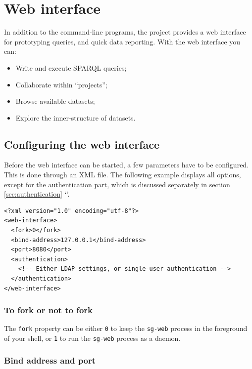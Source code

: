 \chapter{Web interface}
\label{chap:web-interface}

  In addition to the command-line programs, the project provides a web
  interface for prototyping queries, and quick data reporting.  With the
  web interface you can:
  \begin{itemize}
  \item Write and execute SPARQL queries;
  \item Collaborate within ``projects'';
  \item Browse available datasets;
  \item Explore the inner-structure of datasets.
  \end{itemize}

\section{Configuring the web interface}
\label{sec:configuring-sg-web}

  Before the web interface can be started, a few parameters have to be
  configured.  This is done through an XML file.  The following example
  displays all options, except for the authentication part, which is
  discussed separately in section \ref{sec:authentication}
  {\color{LinkGray}`'}.

\begin{siderules}
\begin{verbatim}
<?xml version="1.0" encoding="utf-8"?>
<web-interface>
  <fork>0</fork>
  <bind-address>127.0.0.1</bind-address>
  <port>8080</port>
  <authentication>
    <!-- Either LDAP settings, or single-user authentication -->
  </authentication>
</web-interface>
\end{verbatim}
\end{siderules}

\subsection{To fork or not to fork}

  The \texttt{fork} property can be either \texttt{0} to keep the
  \texttt{sg-web} process in the foreground of your shell, or
  \texttt{1} to run the \texttt{sg-web} process as a daemon.

\subsection{Bind address and port}

